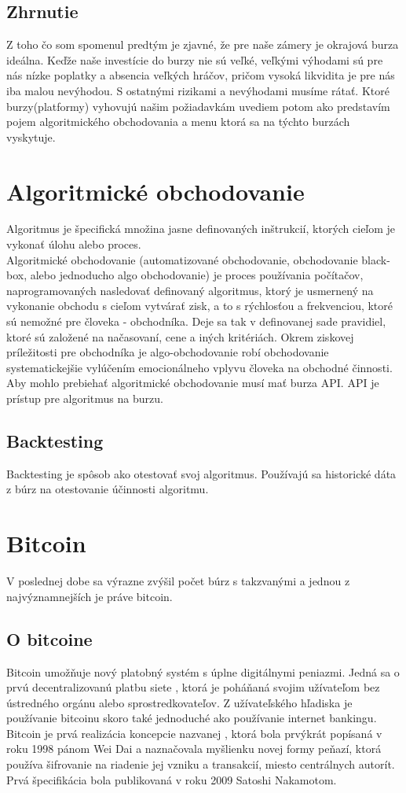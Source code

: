 \subsection{Zhrnutie} 
Z toho čo som spomenul predtým je zjavné,  že pre naše zámery je okrajová burza ideálna. Keďže naše investície do burzy nie sú veľké, veľkými výhodami sú pre nás nízke poplatky a absencia veľkých hráčov, pričom vysoká likvidita je pre nás iba malou nevýhodou. S ostatnými rizikami a nevýhodami musíme rátať. Ktoré burzy(platformy) vyhovujú našim požiadavkám uvediem potom ako predstavím pojem algoritmického obchodovania a menu ktorá sa na týchto burzách vyskytuje.
\section{Algoritmické obchodovanie}
Algoritmus je špecifická množina jasne definovaných inštrukcií, ktorých cieľom je vykonať úlohu alebo proces. \\
Algoritmické obchodovanie (automatizované obchodovanie, obchodovanie black-box, alebo jednoducho algo obchodovanie) je proces používania počítačov, naprogramovaných nasledovať definovaný algoritmus, ktorý je usmernený na vykonanie obchodu s cieľom vytvárať zisk, a to s  rýchlosťou a frekvenciou, ktoré sú nemožné pre človeka - obchodníka. Deje sa tak v definovanej sade pravidiel, ktoré sú založené na načasovaní, cene a iných kritériách. Okrem ziskovej príležitosti pre obchodníka je algo-obchodovanie %
robí obchodovanie systematickejšie vylúčením emocionálneho vplyvu človeka na obchodné činnosti.\cite{Ba} \\
Aby mohlo prebiehať algoritmické obchodovanie musí mať burza API. API je prístup pre algoritmus na burzu.
\subsection{Backtesting} 
Backtesting je spôsob ako otestovať svoj algoritmus. Používajú sa historické dáta z búrz na otestovanie účinnosti algoritmu.
\section{Bitcoin} 
V poslednej dobe sa výrazne zvýšil počet búrz s takzvanými  a jednou z najvýznamnejších je práve bitcoin.
\subsection{O bitcoine} 
Bitcoin umožňuje nový platobný systém s úplne digitálnymi peniazmi. Jedná sa o prvú decentralizovanú platbu siete , ktorá je poháňaná svojim užívateľom bez ústredného orgánu alebo sprostredkovateľov. Z užívateľského hľadiska je používanie bitcoinu skoro také jednoduché ako používanie internet bankingu. Bitcoin je prvá realizácia koncepcie nazvanej , ktorá bola prvýkrát popísaná v roku 1998 pánom Wei Dai a naznačovala myšlienku novej formy peňazí, ktorá používa šifrovanie na riadenie jej vzniku a transakcií, miesto centrálnych autorít.  Prvá špecifikácia bola publikovaná v roku 2009  Satoshi Nakamotom. 
